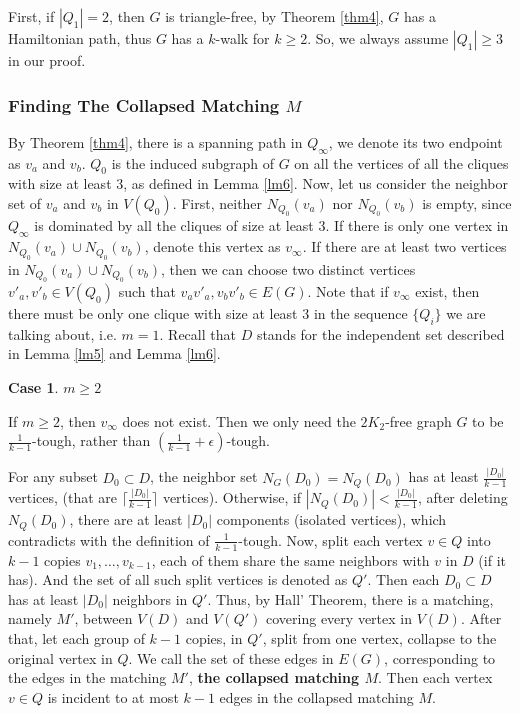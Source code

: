 \documentclass{amsart}
\newtheorem{case}{Case}
\begin{document}
First, if $|Q_1|=2$, then $G$ is triangle-free, by Theorem \ref{thm4}, $G$ has a Hamiltonian path, thus $G$ has a $k$-walk for $k\ge2$. So, we always assume $|Q_1|\ge3$ in our proof.

\subsubsection{Finding The Collapsed Matching $M$}
By Theorem \ref{thm4}, there is a spanning path in $Q_{\infty}$, we denote its two endpoint as $v_a$ and $v_b$. $Q_0$ is the induced subgraph of $G$ on all the vertices of all the cliques with size at least 3, as defined in Lemma \ref{lm6}. Now, let us consider the neighbor set of $v_a$ and $v_b$ in $V(Q_0)$. First, neither $N_{Q_0}(v_a)$ nor $N_{Q_0}(v_b)$ is empty, since $Q_{\infty}$ is dominated by all the cliques of size at least 3. If there is only one vertex in $N_{Q_0}(v_a)\cup N_{Q_0}(v_b)$, denote this vertex as $v_{\infty}$. If there are at least two vertices in $N_{Q_0}(v_a)\cup N_{Q_0}(v_b)$, then we can choose two distinct vertices $v'_a,v'_b\in V(Q_0)$ such that $v_av'_a,v_bv'_b\in E(G)$. Note that if $v_{\infty}$ exist, then there must be only one clique with size at least 3 in the sequence $\{Q_i\}$ we are talking about, i.e. $m=1$.
Recall that $D$ stands for the independent set described in Lemma \ref{lm5} and Lemma \ref{lm6}. 

\begin{case}$m\ge2$\end{case}
If $m\ge2$, then $v_{\infty}$ does not exist. Then we only need the $2K_2$-free graph $G$ to be $\frac{1}{k-1}$-tough, rather than $(\frac{1}{k-1}+\epsilon)$-tough.

For any subset $D_0\subset D$, the neighbor set $N_{G}(D_0)=N_Q(D_0)$ has at least $\frac{|D_0|}{k-1}$ vertices, (that are $\lceil\frac{|D_0|}{k-1}\rceil$ vertices). Otherwise, if $|N_Q(D_0)|<\frac{|D_0|}{k-1}$, after deleting $N_Q(D_0)$, there are at least $|D_0|$ components (isolated vertices), which contradicts with the definition of $\frac{1}{k-1}$-tough. 
Now, split each vertex $v\in Q$ into $k-1$ copies $v_1,\ldots,v_{k-1}$, each of them share the same neighbors with $v$ in $D$ (if it has). And the set of all such split vertices is denoted as $Q'$.  Then each $D_0\subset D$ has at least $|D_0|$ neighbors in $Q'$.
Thus, by Hall' Theorem, there is a matching, namely $M'$, between $V(D)$ and $V(Q')$ covering every vertex in $V(D)$. 
After that, let each group of $k-1$ copies, in $Q'$, split from one vertex, collapse to the original vertex in $Q$. We call the set of these edges in $E(G)$, corresponding to the edges in the matching $M'$, {\bf the collapsed matching $M$}. Then each vertex $v\in Q$ is incident to at most $k-1$ edges in the collapsed matching $M$. 
\end{document}

